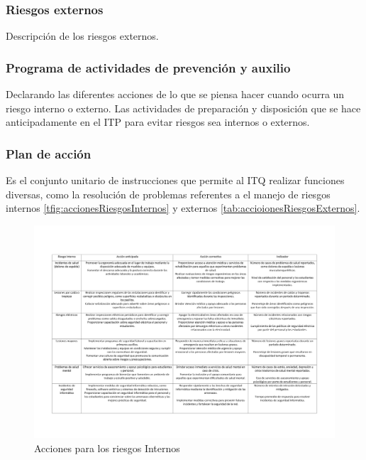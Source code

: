     
    
    \subsubsection{Riesgos externos}
    
    Descripción de los riesgos externos.
    \subsubsection{Programa de actividades de prevención y auxilio}
    
    Declarando las diferentes acciones de lo que se piensa hacer cuando ocurra un riesgo interno o externo. 
    Las actividades de preparación y disposición que se hace anticipadamente en el ITP para evitar riesgos sea internos o externos.
    \subsubsection{Plan de acción}
    
    
    Es el conjunto unitario de instrucciones que permite al ITQ realizar funciones diversas, como la resolución de problemas referentes a el manejo de riesgos internos \ref{tfig:accionesRiesgosInternos} y externos \ref{tab:accioionesRiesgosExternos}.
    
    \begin{figure}[H]
        \centering
        \includegraphics[scale=0.150]{21/img/accionesRiesgosInternos.pdf}
        \caption{Acciones para los riesgos Internos}
        \label{fig:accionesRiesgosInternos}
    \end{figure}
    

